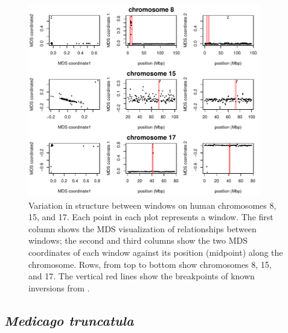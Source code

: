 \documentclass[11pt, oneside]{article}   	%
\begin{document}
\begin{figure}
    \begin{center}
       \includegraphics[width=0.9\textwidth]{Fig4_POPRES_Together_MDS_plot_chr8_15_17}
    \end{center}
    \caption{
         Variation in structure between windows on human chromosomes 8, 15, and 17. 
         Each point in each plot represents a window.
         The first column shows the MDS visualization of relationships between windows;
         the second and third columns show the two MDS coordinates of each window against its position (midpoint) along the chromosome. 
         Rows, from top to bottom show chromosomes 8, 15, and 17. 
         The vertical red lines show the breakpoints of known inversions from \citet{antonacci2009characterization}.
        \label{fig:mds_human}
    }
\end{figure}


\subsection{\textit{Medicago truncatula}}
\end{document}
